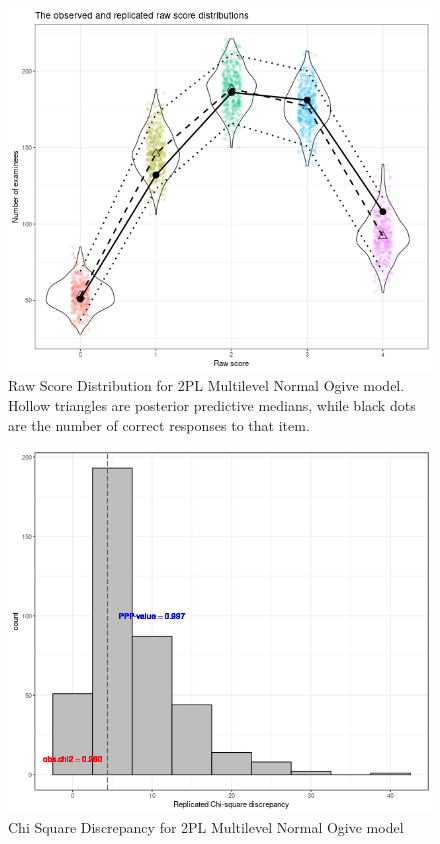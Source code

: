\documentclass[12pt]{article}
\begin{document}
\begin{figure}[h]
\vspace{-0.5cm}
  \centering
  \includegraphics[width=1\columnwidth]{Plots/Plots_2PL_mlirt_Ogive_NC/raw_score_dist.png}
  \caption{Raw Score Distribution for 2PL Multilevel Normal Ogive model. Hollow triangles are posterior predictive medians, while black dots are the number of correct responses to that item.}
  \label{2pl_ogive_nc_mlirt_raw_score}
\end{figure}

\begin{figure}[h]
\vspace{-0.5cm}
  \centering
  \includegraphics[width=1\columnwidth]{Plots/Plots_2PL_mlirt_Ogive_NC/chi_square.png}
  \caption{Chi Square Discrepancy for 2PL Multilevel Normal Ogive model}
  \label{2pl_ogive_nc_mlirt_chi_squar}
\end{figure}
\end{document}
